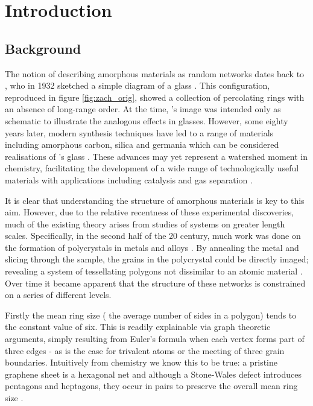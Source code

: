 \chapter{Introduction}
\label{ch:intro}

\section{Background}
\label{s:background}

The notion of describing amorphous materials as random networks dates back to \zach, who in 1932 sketched a simple diagram of a \td{} glass \cite{Zachariasen1932}.
This configuration, reproduced in figure \ref{fig:zach_orig}, showed a collection of percolating rings with an absence of long\--range order.
At the time, \zach's image was intended only as schematic to illustrate the analogous effects in \thd{} glasses.
However, some eighty years later, modern synthesis techniques have led to a range of \td{} materials including amorphous carbon, silica and germania which can be considered realisations of \zach's glass \cite{Kotakoski2011,Robertson2012,Huang2012,Lichtenstein2012b,Lewandowski2018}.
These advances may yet represent a watershed moment in chemistry, facilitating the development of a wide range of technologically useful materials with applications including catalysis and gas separation \cite{Trogadas2014,Sun2015a,Buchner2017}.

It is clear that understanding the structure of amorphous materials is key to this aim.
However, due to the relative recentness of these experimental discoveries, much of the existing theory arises from studies of systems on greater length scales.
Specifically, in the second half of the 20\th{} century, much work was done on the formation of polycrystals in metals and alloys .
By annealing the metal and slicing through the sample, the grains in the polycrystal could be directly imaged; revealing a system of tessellating polygons not dissimilar to an atomic material \cite{Beck1954,Dunn1957}.
Over time it became apparent that the structure of these networks is constrained on a series of different levels.

Firstly the mean ring size (\ie{} the average number of sides in a polygon) tends to the constant value of six.
This is readily explainable via graph theoretic arguments, simply resulting from Euler's formula when each vertex forms part of three edges - as is the case for trivalent atoms or the meeting of three grain boundaries.
Intuitively from chemistry we know this to be true: a pristine graphene sheet is a hexagonal net and although a Stone\--Wales defect introduces pentagons and heptagons, they occur in pairs to preserve the overall mean ring size \cite{Stone1986}.

